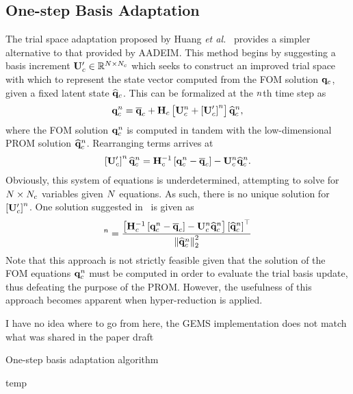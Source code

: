 \subsection{One-step Basis Adaptation}
%
The trial space adaptation proposed by Huang \textit{et al.}~\cite{Huang2022a} provides a simpler alternative to that provided by AADEIM. This method begins by suggesting a basis increment $\consTrialUpdate \inRTwo{\numDOF}{\numConsModes}$ which seeks to construct an improved trial space with which to represent the state vector computed from the FOM solution $\mathbf{q}_{c}$, given a fixed latent state $\mathbf{\widehat{q}}_{c}$. This can be formalized at the $n$th time step as
%
\begin{eqnarray}
	\consVec^{\timeIdx} = \consVecCent + \consScale \left[\consTrial^{\timeIdx} + \left[\consTrialUpdate\right]^{\timeIdx} \right] \consVecCoef^{\timeIdx},
\end{eqnarray}
%
where the FOM solution $\mathbf{q}_{c}^{n}$ is computed in tandem with the low-dimensional PROM solution $\mathbf{\widehat{q}}_{c}^{n}$. Rearranging terms arrives at
%
\begin{eqnarray}
	\left[\consTrialUpdate\right]^{\timeIdx} \consVecCoef^{\timeIdx} = \consScaleInv \left[\consVec^{\timeIdx} - \consVecCent\right] - \consTrial^{\timeIdx} \consVecCoef^{\timeIdx}.
\end{eqnarray}
%
Obviously, this system of equations is underdetermined, attempting to solve for $N \times N_c$ variables given $N$ equations. As such, there is no unique solution for $\left[\consTrialUpdate\right]^{\timeIdx}$. One solution suggested in~\cite{Huang2022a} is given as
%
\begin{equation}
	[\consTrialUpdate]^{\timeIdx} = \frac{\left[\consScaleInv\left[\consVec^{\timeIdx} - \consVecCent\right] - \consTrial^{\timeIdx} \consVecCoef^{\timeIdx}\right]\left[\consVecCoef^{\timeIdx}\right]^\top}{\left\Vert \consVecCoef^{\timeIdx} \right\Vert^2_2}
\end{equation}
%
Note that this approach is not strictly feasible given that the solution of the FOM equations $\mathbf{q}_{c}^{n}$ must be computed in order to evaluate the trial basis update, thus defeating the purpose of the PROM. However, the usefulness of this approach becomes apparent when hyper-reduction is applied.

{\color{red}I have no idea where to go from here, the GEMS implementation does not match what was shared in the paper draft}

\begin{algorithm}
	\caption{One-step basis adaptation algorithm}\label{alg:oneStep}
	\begin{algorithmic}
		\STATE temp
	\end{algorithmic}
\end{algorithm}



